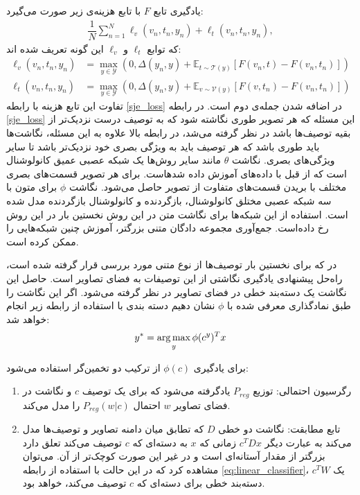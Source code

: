 یادگیری تابع $F$ با تابع هزینه‌ی زیر صورت می‌گیرد:
\begin{align}
\label{eq:objective_actual}
\dfrac{1}{N}\sum_{n=1}^{N} \ell_v(v_n, t_n, y_n) + \ell_t(v_n, t_n, y_n),
\end{align}
که توابع $ \ell_t$ و $\ell_v$ این گونه تعریف شده اند:
\begin{align*}
\ell_v(v_n, t_n, y_n) &=  \underset{y \in \mathcal{Y}}{\max}(0,\Delta(y_n, y) + \mathbb{E}_{t \sim \mathcal{T}(y)} [ F(v_n,t) - F(v_n,t_n) ]) \\
\ell_t(v_n, t_n, y_n) &= \underset{y \in \mathcal{Y}}{\max}(0,\Delta(y_n, y) + \mathbb{E}_{v \sim \mathcal{V}(y)} [ F(v,t_n) - F(v_n,t_n)])
\end{align*}
تفاوت این تابع هزینه با  رابطه \eqref{sje_loss} در اضافه شدن جمله‌ی دوم است. در  رابطه \eqref{sje_loss} این مسئله که هر تصویر طوری نگاشته شود که به توصیف درست نزدیک‌تر از بقیه توصیف‌ها باشد در نظر گرفته می‌شد، در رابطه بالا علاوه به این مسئله، نگاشت‌ها باید طوری باشد که هر توصیف باید به ويژگی بصری خود نزدیک‌تر باشد تا سایر ویژگی‌های بصری.
نگاشت $\theta$ مانند سایر روش‌ها یک شبکه عصبی عمیق کانولوشنال است که از قبل با داده‌های  آموزش داده شدهاست. برای هر تصویر قسمت‌های بصری مختلف با بریدن قسمت‌های متفاوت از تصویر حاصل می‌شود. نگاشت $\phi$ برای متون با سه شبکه عصبی مختلق کانولوشنال، بازگردنده و کانولوشنال بازگردنده مدل شده است. استفاده از این شبکه‌ها برای نگاشت متن در این روش نخستین بار در این روش رخ داده‌است. جمع‌آوری مجموعه دادگان متنی بزرگتر، آموزش چنین شبکه‌هایی را ممکن کرده است.

در  \cite{mohamed13} که برای نخستین بار توصیف‌ها از نوع متنی مورد بررسی قرار گرفته شده است، راه‌حل پیشنهادی یادگیری نگاشتی از این توصیفات به فضای تصاویر است. حاصل این نگاشت یک دسته‌بند خطی در فضای تصاویر در نظر گرفته می‌شود. اگر این نگاشت را طبق نمادگذاری معرفی شده با $\phi$ نشان دهیم دسته بندی با استفاده از رابطه زیر انجام خواهد شد:
\begin{equation} \label{eq:linear_classifier}
y^* = \operatorname*{arg\,max}_y \phi(c^y)^T x
\end{equation}


برای یادگیری $\phi(c)$ از ترکیب دو تخمین‌گر استفاده می‌شود:
\begin{enumerate}
\item
رگرسیون احتمالی: توزیع $P_{reg}$ یادگرفته می‌شود که برای یک توصیف $c$ و نگاشت در فضای تصاویر $w$ احتمال $P_{reg}(w|c)$ را مدل می‌کند.
\item
تابع مطابقت: نگاشت دو خطی $D$ که تطابق میان دامنه تصاویر و توصیف‌ها مدل می‌کند به عبارت دیگر $c^TDx$ زمانی که $x$ به دسته‌ای که   $c$ توصیف می‌کند تعلق دارد بزرگتر از مقدار آستانه‌ای است و در غیر این صورت کوچک‌تر از آن. می‌توان مشاهده کرد که در این حالت با استفاده از رابطه
\eqref{eq:linear_classifier}،
 $c^TW$
یک  دسته‌بند خطی برای دسته‌ای که $c$ توصیف می‌کند، خواهد بود.
\end{enumerate}

